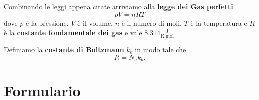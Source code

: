 \documentclass[a4paper]{report}
\begin{document}
\noindent Combinando le leggi appena citate arriviamo alla \textbf{legge dei Gas perfetti}
\[\boxed{pV=nRT}\]
dove $p$ \`e la pressione, $V$ \`e il volume, $n$ \`e il numero di moli, $T$ \`e la temperatura e $R$ \`e la \textbf{costante fondamentale dei gas} e vale $8.314 \frac{\mathrm{J}}{\mathrm{K}\ \mathrm{mol}}$.

\begin{definition}
Definiamo la \textbf{costante di Boltzmann} $k_b$ in modo tale che 
\[R=N_a k_b.\]
\end{definition}









\part*{Formulario}



%
\end{document}
